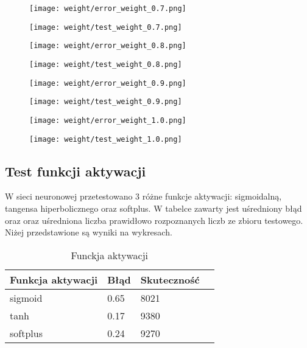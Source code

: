 \documentclass{article}
\begin{document}
\begin{figure}[]
  \centering
  \texttt{[image: weight/error\_weight\_0.7.png]}
\end{figure}

\begin{figure}[]
  \centering
  \texttt{[image: weight/test\_weight\_0.7.png]}
\end{figure}

\begin{figure}[]
  \centering
  \texttt{[image: weight/error\_weight\_0.8.png]}
\end{figure}

\begin{figure}[]
  \centering
  \texttt{[image: weight/test\_weight\_0.8.png]}
\end{figure}

\begin{figure}[]
  \centering
  \texttt{[image: weight/error\_weight\_0.9.png]}
\end{figure}

\begin{figure}[]
  \centering
  \texttt{[image: weight/test\_weight\_0.9.png]}
\end{figure}

\begin{figure}[]
  \centering
  \texttt{[image: weight/error\_weight\_1.0.png]}
\end{figure}

\begin{figure}[]
  \centering
  \texttt{[image: weight/test\_weight\_1.0.png]}
\end{figure}


\subsection{Test funkcji aktywacji}

W sieci neuronowej przetestowano 3 różne funkcje aktywacji: sigmoidalną, tangensa hiperbolicznego oraz softplus.
W tabelce zawarty jest uśredniony błąd oraz oraz uśredniona liczba prawidłowo rozpoznanych
liczb ze zbioru testowego. Niżej przedstawione są wyniki na wykresach.

\begin{table}[h]
  \centering
    
  \bgroup
  \def\arraystretch{1.3}
  \begin{tabular}{|l|l|l|l|}
  \hline
  Funkcja aktywacji & Błąd & Skuteczność \\ \hline
  sigmoid & 0.65 & 8021 \\ \hline
  tanh & 0.17 & 9380 \\ \hline
  softplus & 0.24 & 9270 \\ \hline
  \end{tabular}
  \egroup
  \vspace{10pt}
  \caption{Funckja aktywacji}
\end{table}
\end{document}
